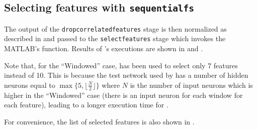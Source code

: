 \subsection{Selecting features with
\texttt{sequentialfs}}\label{subsec:sequentialfs}

The output of the \texttt{dropcorrelatedfeatures} stage is then normalized as
described in  and passed to the
\texttt{selectfeatures} stage which invokes the MATLAB's 
function. Results of 's executions are shown in
 and .

Note that, for the ``Windowed'' case,  has been used to
select only 7 features instead of 10. This is because the test network used by
 has a number of hidden neurons equal to \(\max
\{5,\lfloor\frac{N}{2}\rfloor\}\) where \(N\) is the number of input neurons
which is higher in the ``Windowed'' case (there is an input neuron for each
window for each feature), leading to a longer execution time for
.




For convenience, the list of selected features is also shown in
.

